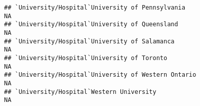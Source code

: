 \documentclass[]{article}
\begin{document}
\begin{verbatim}
## `University/Hospital`University of Pennsylvania                                                                                                                                                                                                                                                                                                                                                                                                                                      NA
## `University/Hospital`University of Queensland                                                                                                                                                                                                                                                                                                                                                                                                                                        NA
## `University/Hospital`University of Salamanca                                                                                                                                                                                                                                                                                                                                                                                                                                         NA
## `University/Hospital`University of Toronto                                                                                                                                                                                                                                                                                                                                                                                                                                           NA
## `University/Hospital`University of Western Ontario                                                                                                                                                                                                                                                                                                                                                                                                                                   NA
## `University/Hospital`Western University                                                                                                                                                                                                                                                                                                                                                                                                                                              NA

\end{verbatim}
\end{document}
